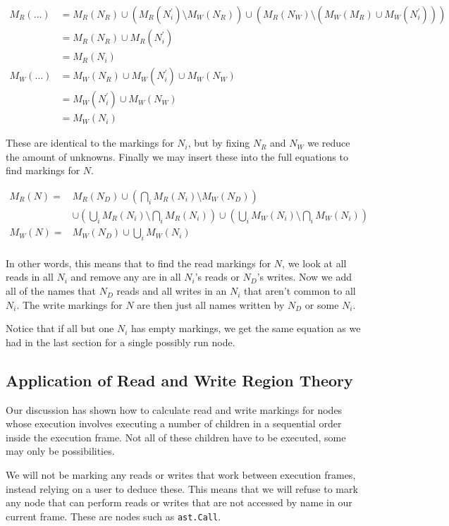 \documentclass{report}
\begin{document}
\begin{align*}
M_R(\ldots) &= M_R(N_R) \cup (M_R(N_i^\prime) \setminus M_W(N_R)) \cup (M_R(N_W) \setminus (M_W(M_R) \cup M_W(N_i^\prime))) \\
            &= M_R(N_R) \cup M_R(N_i^\prime) \\
            &= M_R(N_i) \\
M_W(\ldots) &= M_W(N_R) \cup M_W(N_i^\prime) \cup M_W(N_W) \\
            &= M_W(N_i^\prime) \cup M_W(N_W) \\
            &= M_W(N_i)
\end{align*}

These are identical to the markings for $N_i$, but by fixing $N_R$ and $N_W$ we reduce the amount of unknowns. Finally we may insert these into
the full equations to find markings for $N$.

\begin{align*}
M_R(N) =& M_R(N_D) \cup (\bigcap_i M_R(N_i) \setminus M_W(N_D)) \\
        & \cup (\bigcup_i M_R(N_i) \setminus \bigcap_i M_R(N_i)) \cup (\bigcup_i M_W(N_i) \setminus \bigcap_i M_W(N_i)) \\
M_W(N) =& M_W(N_D) \cup \bigcup_i M_W(N_i)\\
\end{align*}

In other words, this means that to find the read markings for $N$, we look at all reads in all $N_i$ and remove any are in all $N_i$'s reads or $N_D$'s writes.
Now we add all of the names that $N_D$ reads and all writes in an $N_i$ that aren't common to all $N_i$. The write markings for $N$ are then just all names
written by $N_D$ or some $N_i$.

Notice that if all but one $N_i$ has empty markings, we get the same equation as we had in the last section for a single possibly run node.

\subsection{Application of Read and Write Region Theory}

Our discussion has shown how to calculate read and write markings for nodes whose execution involves executing a number of children in a sequential order inside
the execution frame. Not all of these children have to be executed, some may only be possibilities.

We will not be marking any reads or writes that work between execution frames, instead relying on a user to deduce these. This means that we will refuse to mark
any node that can perform reads or writes that are not accessed by name in our current frame. These are nodes such as \texttt{ast.Call}.
\end{document}
